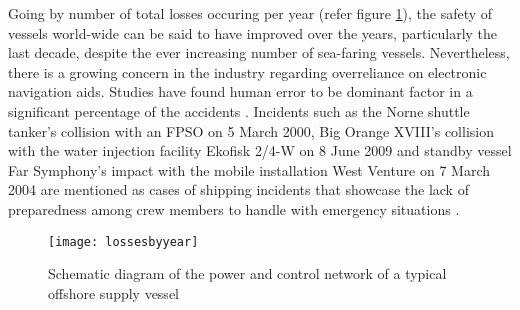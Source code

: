 Going by number of total losses occuring per year (refer figure \ref{fig:lossesbyyear}), the safety of vessels world-wide can be said to have improved over the years, particularly the last decade, despite the ever increasing number of sea-faring vessels. Nevertheless, there is a growing concern in the industry regarding overreliance on electronic navigation aids. Studies have found human error to be dominant factor in a significant percentage of the accidents \citep{baker2005accident, hauff2014analysis}. Incidents such as the Norne shuttle tanker's collision with an FPSO on 5 March 2000, Big Orange XVIII's collision with the water injection facility Ekofisk 2/4-W on 8 June 2009 and standby vessel Far Symphony's impact with the mobile installation West Venture on 7 March 2004 are mentioned as cases of shipping incidents that showcase the lack of preparedness among crew members to handle with emergency situations \citep{vinnem2013offshore}.

\begin{figure}
	\centering
	\texttt{[image: lossesbyyear]}
	\caption{Schematic diagram of the power and control network of a typical offshore supply vessel}
	\label{fig:lossesbyyear}
\end{figure}


